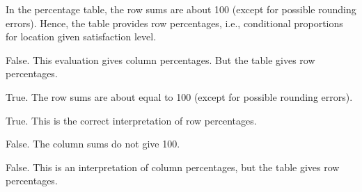 \begin{solution}

In the percentage table, the row sums are about 100
(except for possible rounding errors). Hence, the table provides
row percentages, i.e.,
conditional proportions for location given satisfaction level.

\begin{answerlist}
  \item False. This evaluation gives column percentages. But the table gives  row percentages.
  \item True. The  row sums  are about equal to 100 (except for possible rounding errors).
  \item True. This is the correct interpretation of row percentages.
  \item False. The column sums do not give 100.
  \item False. This is an interpretation of column percentages, but the table gives  row percentages.
\end{answerlist}
\end{solution}

